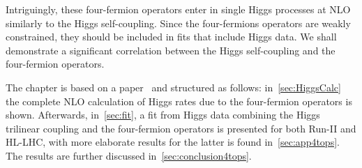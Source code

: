 \par Intriguingly, these four-fermion operators enter in single Higgs processes at NLO similarly to the Higgs self-coupling. Since the four-fermions operators are weakly constrained, they should be included in fits that include Higgs data. We shall demonstrate a significant correlation between the Higgs self-coupling and the four-fermion operators.
\par 
The chapter is based on a paper~\cite{Alasfar:2022zyr} and structured as follows: in~\autoref{sec:HiggsCalc} the complete NLO calculation of Higgs rates due to the four-fermion operators is shown. Afterwards, in~\autoref{sec:fit}, a fit from Higgs data combining the Higgs trilinear coupling and the four-fermion operators is presented for both Run-II and HL-LHC, with more elaborate results for the latter is found in~\autoref{sec:app4tops}. The results are further discussed in~\autoref{sec:conclusion4tops}.
